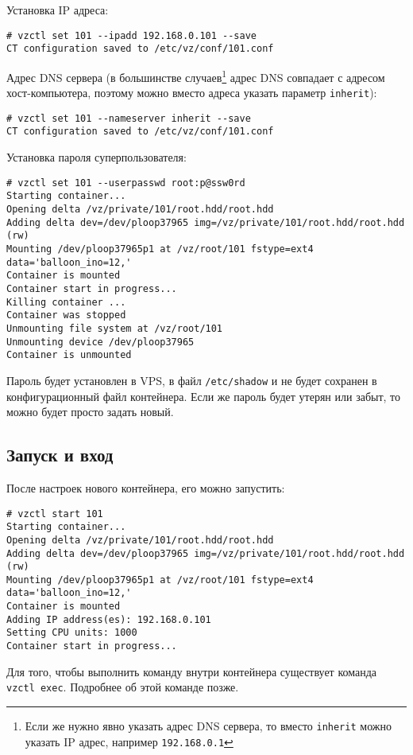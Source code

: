 Установка IP адреса:
\begin{lstlisting}
# vzctl set 101 --ipadd 192.168.0.101 --save
CT configuration saved to /etc/vz/conf/101.conf
\end{lstlisting}

Адрес DNS сервера (в большинстве случаев\footnote{Если же нужно явно указать адрес DNS сервера, то вместо \texttt{inherit} можно указать IP адрес, например \texttt{192.168.0.1}} адрес DNS совпадает с адресом хост-компьютера, поэтому можно вместо адреса указать параметр \texttt{inherit}):
\begin{lstlisting}
# vzctl set 101 --nameserver inherit --save
CT configuration saved to /etc/vz/conf/101.conf
\end{lstlisting}

Установка пароля суперпользователя:
\begin{lstlisting}
# vzctl set 101 --userpasswd root:p@ssw0rd
Starting container...
Opening delta /vz/private/101/root.hdd/root.hdd
Adding delta dev=/dev/ploop37965 img=/vz/private/101/root.hdd/root.hdd (rw)
Mounting /dev/ploop37965p1 at /vz/root/101 fstype=ext4 data='balloon_ino=12,' 
Container is mounted
Container start in progress...
Killing container ...
Container was stopped
Unmounting file system at /vz/root/101
Unmounting device /dev/ploop37965
Container is unmounted
\end{lstlisting}

Пароль будет установлен в VPS, в файл \texttt{/etc/shadow} и не будет сохранен в конфигурационный файл контейнера.
Если же пароль будет утерян или забыт, то можно будет просто задать новый.

\subsection{Запуск и вход}
После настроек нового контейнера, его можно запустить:
\begin{lstlisting}
# vzctl start 101
Starting container...
Opening delta /vz/private/101/root.hdd/root.hdd
Adding delta dev=/dev/ploop37965 img=/vz/private/101/root.hdd/root.hdd (rw)
Mounting /dev/ploop37965p1 at /vz/root/101 fstype=ext4 data='balloon_ino=12,' 
Container is mounted
Adding IP address(es): 192.168.0.101
Setting CPU units: 1000
Container start in progress...
\end{lstlisting}

Для того, чтобы выполнить команду внутри контейнера существует команда \texttt{vzctl exec}.
Подробнее об этой команде позже.

